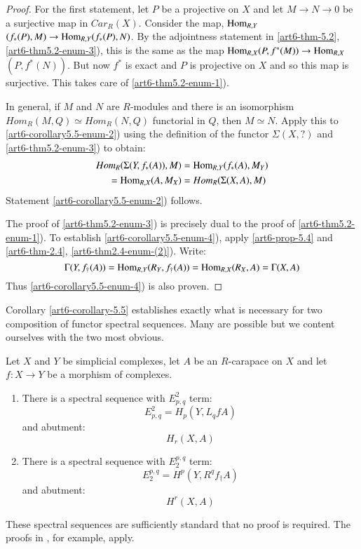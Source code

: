 \begin{proof}
For the first statement, let $P$ be a projective on $X$ and let $M \rightarrow N \rightarrow 0$ be a surjective map in $C ar_{R}(X)$. Consider the map, $\operatorname{Hom}_{R, Y}$ $(f_{*}(P), M) \rightarrow \operatorname{Hom}_{R,Y}(f_{*}(P), N)$. By the adjointness statement in \ref{art6-thm-5.2}, \ref{art6-thm5.2-enum-3}), this is the same as the map $\operatorname{Hom}_{R, X}(P, f^{*}(M))\rightarrow \operatorname{Hom}_{R,X}$ $(P, f^{*}(N))$. But now $f^{*}$ is exact and $P$ is projective on $X$ and so this map is surjective. This takes care of \ref{art6-thm5.2-enum-1}).

In general, if $M$ and $N$ are $R$-modules and there is an isomorphism $Hom_{R}(M,Q) \simeq Hom_{R}(N,Q)$ functorial in $Q$, then $M \simeq N$. Apply this to \ref{art6-corollary5.5-enum-2}) using the definition of the functor $\Sigma(X, ?)$ and
\ref{art6-thm5.2-enum-3}) to obtain:
\begin{align*}
Hom_{R}(\Sigma(Y, f_{*}(A)), M) &= \operatorname{Hom}_{R,Y}(f_{*}(A), M_{Y})\\
= \operatorname{Hom}_{R,X}(A, M_{X}) &= Hom_{R}(\Sigma(X, A), M)
\end{align*}
Statement \ref{art6-corollary5.5-enum-2}) follows.

The proof of \ref{art6-thm5.2-enum-3}) is precisely dual to the proof of \ref{art6-thm5.2-enum-1}). To establish
\ref{art6-corollary5.5-enum-4}), apply \ref{art6-prop-5.4} and \ref{art6-thm-2.4}, \ref{art6-thm2.4-enum-(2)}). Write:
$$
\Gamma (Y, f_{\dagger}(A)) = \operatorname{Hom}_{R,Y}(R_{Y}, f_{\dagger}(A)) = \operatorname{Hom}_{R,X}(R_{X}, A) = \Gamma(X,A)
$$
Thus \ref{art6-corollary5.5-enum-4}) is also proven.
\end{proof}

Corollary \ref{art6-corollary-5.5} establishes exactly what is necessary for two composition of functor spectral sequences. Many are possible but we content ourselves with the two most obvious.


\begin{prop}\label{art6-prop-5.6}
Let $X$ and $Y$ be simplicial complexes, let $A$ be an $R$-carapace on $X$ and let $f:X\rightarrow Y$ be a morphism of complexes.
\begin{enumerate}[(1)]
\item There is a spectral sequence with $E_{p,q}^{2}$ term:
    $$
    E_{p,q}^{2} = H_{p}(Y, L_{q}fA)
    $$
    and abutment:
    $$
    H_{r}(X, A)
    $$
    \item There is a spectral sequence with $E_{2}^{p,q}$ term:
        $$
        E_{2}^{p, q} =H^{p}(Y, R^{q} f_{\dagger}A)
        $$
        and abutment:
        $$
        H^{r}(X, A)
        $$
\end{enumerate}

These spectral sequences are sufficiently standard that no proof is required. The proofs in \cite{art6-keyGr}, for example, apply.
\end{prop}

